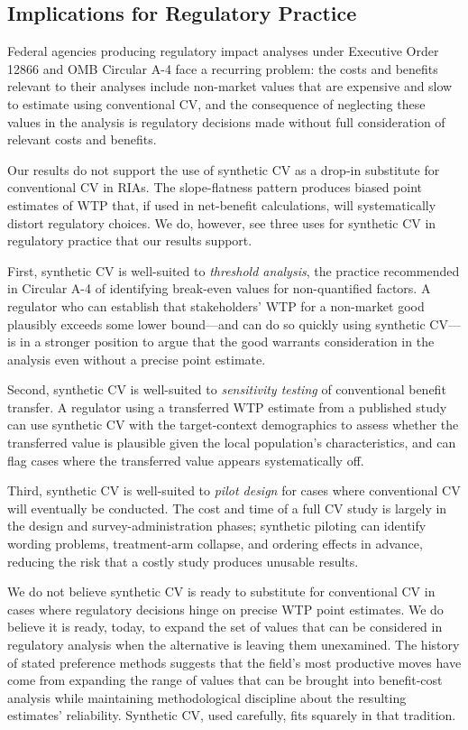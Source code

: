 \documentclass[12pt]{article}
\begin{document}
\subsection{Implications for Regulatory Practice}\label{sec:disc-policy}

Federal agencies producing regulatory impact analyses under Executive
Order 12866 and OMB Circular A-4 face a recurring problem: the costs
and benefits relevant to their analyses include non-market values that
are expensive and slow to estimate using conventional CV, and the
consequence of neglecting these values in the analysis is regulatory
decisions made without full consideration of relevant costs and benefits.

Our results do not support the use of synthetic CV as a drop-in
substitute for conventional CV in RIAs. The slope-flatness pattern
produces biased point estimates of WTP that, if used in net-benefit
calculations, will systematically distort regulatory choices. We do,
however, see three uses for synthetic CV in regulatory practice that
our results support.

First, synthetic CV is well-suited to \emph{threshold analysis}, the
practice recommended in Circular A-4 of identifying break-even values
for non-quantified factors. A regulator who can establish that
stakeholders' WTP for a non-market good plausibly exceeds some lower
bound---and can do so quickly using synthetic CV---is in a stronger
position to argue that the good warrants consideration in the analysis
even without a precise point estimate.

Second, synthetic CV is well-suited to \emph{sensitivity testing} of
conventional benefit transfer. A regulator using a transferred WTP
estimate from a published study can use synthetic CV with the
target-context demographics to assess whether the transferred value is
plausible given the local population's characteristics, and can flag
cases where the transferred value appears systematically off.

Third, synthetic CV is well-suited to \emph{pilot design} for cases
where conventional CV will eventually be conducted. The cost and time of
a full CV study is largely in the design and survey-administration
phases; synthetic piloting can identify wording problems, treatment-arm
collapse, and ordering effects in advance, reducing the risk that a
costly study produces unusable results.

We do not believe synthetic CV is ready to substitute for conventional
CV in cases where regulatory decisions hinge on precise WTP point
estimates. We do believe it is ready, today, to expand the set of
values that can be considered in regulatory analysis when the
alternative is leaving them unexamined. The history of stated preference
methods suggests that the field's most productive moves have come from
expanding the range of values that can be brought into benefit-cost
analysis while maintaining methodological discipline about the resulting
estimates' reliability. Synthetic CV, used carefully, fits squarely in
that tradition.
\end{document}
